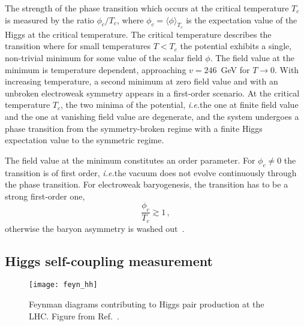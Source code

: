 \documentclass[aps,prd,11pt,tightenlines,superscriptaddress,nofootinbib,preprintnumbers,notitlepage]{revtex4-1}
\newcommand{\ie}{\textsl{i.e.}\;}
\begin{document}
The strength of the phase transition which occurs at the critical
temperature $T_c$ is measured by the ratio $\phi_c/T_c$, where
$\phi_c=\langle \phi\rangle_{T_c}$ is the expectation value of the
Higgs at the critical temperature. The critical temperature describes
the transition where for small temperatures $T <T_c$ the potential
exhibits a single, non-trivial minimum for some value of the scalar
field $\phi$.  The field value at the minimum is temperature
dependent, approaching $v=246$~GeV for $T \rightarrow 0$.  With
increasing temperature, a second minimum at zero field value and with
an unbroken electroweak symmetry appears in a first-order scenario.
At the critical temperature $T_c$, the two minima of the potential,
\ie the one at finite field value and the one at vanishing field value
are degenerate, and the system undergoes a phase transition from the
symmetry-broken regime with a finite Higgs expectation value to the
symmetric regime.

The field value at the minimum constitutes an order parameter.  For
$\phi_c \neq 0$ the transition is of first order, \ie the vacuum does
not evolve continuously through the phase transition. For electroweak
baryogenesis, the transition has to be a strong first-order one,
%
\begin{equation}
  \frac{\phi_c}{T_c} \gtrsim 1 \,,
\end{equation}
%
otherwise the baryon asymmetry is washed
out~\cite{Shaposhnikov:1991cu}.

\subsection{Higgs self-coupling measurement}
\label{sec:self}

\begin{figure}[b!]
  \texttt{[image: feyn\_hh]}
\caption{Feynman diagrams contributing to Higgs pair production at the
  LHC. Figure from Ref.~\cite{uli1}.}
\label{fig:feynman}
\end{figure}
\end{document}
